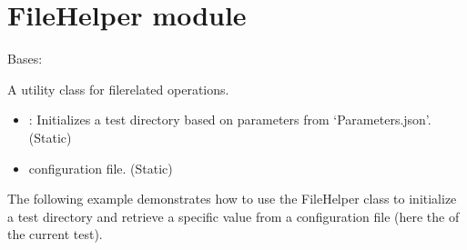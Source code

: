 \documentclass[letterpaper,10pt,english]{sphinxmanual}
\begin{document}
\sphinxstepscope


\section{FileHelper module}
\label{\detokenize{FileHelper:module-FileHelper}}\label{\detokenize{FileHelper:filehelper-module}}\label{\detokenize{FileHelper::doc}}

\begin{fulllineitems}
\label{\detokenize{FileHelper:FileHelper.FileHelper}}
\pysigstartsignatures
{}
\pysigstopsignatures
\sphinxAtStartPar
Bases: 

\sphinxAtStartPar
A utility class for file\sphinxhyphen{}related operations.
\begin{description}
\begin{itemize}
\item {} 
\sphinxAtStartPar
{}: Initializes a test directory based on parameters from ‘Parameters.json’. (Static)

\item {} \begin{description}
\sphinxAtStartPar
configuration file. (Static)

\end{description}

\end{itemize}

\sphinxAtStartPar
The following example demonstrates how to use the FileHelper class to initialize a test directory and retrieve
a specific value from a configuration file (here the  of the current test).

\begin{sphinxVerbatim}[commandchars=\\\{\}]
  
   
\end{sphinxVerbatim}


\end{description}
\end{fulllineitems}
\end{document}
